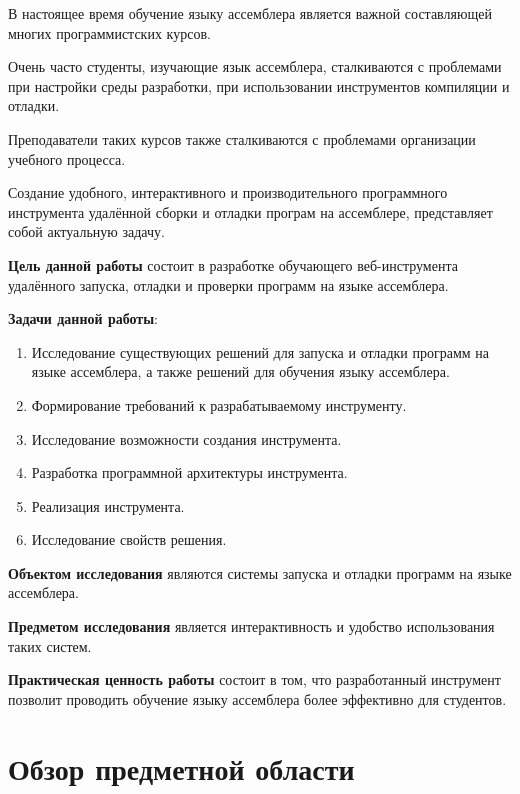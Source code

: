 \documentclass[a4paper,article,14pt]{extarticle}
\begin{document}


\tableofcontents
\pagebreak


В настоящее время обучение языку ассемблера является важной составляющей многих программистских курсов.

Очень часто студенты, изучающие язык ассемблера, сталкиваются с проблемами при настройки среды разработки, при использовании инструментов компиляции и отладки.

Преподаватели таких курсов также сталкиваются с проблемами организации учебного процесса.

Создание удобного, интерактивного и производительного программного инструмента удалённой сборки и отладки програм на ассемблере, представляет собой актуальную задачу.


\textbf{Цель данной работы} состоит в разработке обучающего веб-инструмента удалённого запуска, отладки и проверки программ на языке ассемблера.

\textbf{Задачи данной работы}:

\begin{enumerate}
    \item Исследование существующих решений для запуска и отладки программ на языке ассемблера, а также решений для обучения языку ассемблера.
    \item Формирование требований к разрабатываемому инструменту.
    \item Исследование возможности создания инструмента.
    \item Разработка программной архитектуры инструмента.
    \item Реализация инструмента.
    \item Исследование свойств решения.
\end{enumerate}

\textbf{Объектом исследования} являются системы запуска и отладки программ на языке ассемблера.

\textbf{Предметом исследования} является интерактивность и удобство использования таких систем.

\textbf{Практическая ценность работы} состоит в том, что разработанный инструмент позволит проводить обучение языку ассемблера более эффективно для студентов.

\section{Обзор предметной области}
\end{document}
